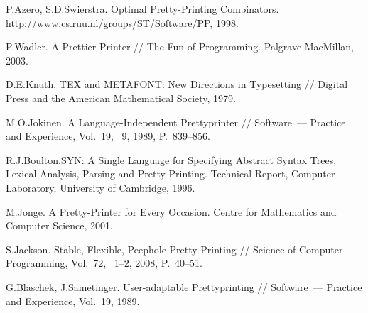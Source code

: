 \begin{thebibliography}{99}
    P.Azero, S.D.Swierstra. Optimal Pretty-Printing Combinators.
    \url{http://www.cs.ruu.nl/groups/ST/Software/PP}, 1998.

    P.Wadler. A Prettier Printer // The Fun of Programming. Palgrave MacMillan, 2003.

    D.E.Knuth. TEX and METAFONT: New Directions in Typesetting //
    Digital Press and the American Mathematical Society, 1979.

    M.O.Jokinen. A Language-Independent Prettyprinter // Software~--- Practice and Experience,
    Vol.~19, \textnumero~9, 1989, P.~839--856.

    R.J.Boulton.SYN: A Single Language for Specifying Abstract Syntax Trees, Lexical Analysis, 
    Parsing and Pretty-Printing. Technical Report, Computer Laboratory, University of Cambridge,
    1996.

    M.Jonge. A Pretty-Printer for Every Occasion. Centre for Mathematics and Computer Science,
    2001.

    S.Jackson. Stable, Flexible, Peephole Pretty-Printing // Science of Computer Programming,
    Vol.~72, \textnumero~1--2, 2008, P.~40--51.

    G.Blaschek, J.Sametinger. User-adaptable Prettyprinting // Software~--- Practice and Experience,
    Vol.~19, 1989.
\end{thebibliography}
